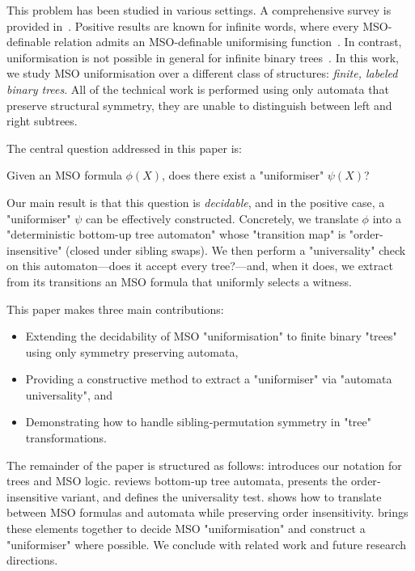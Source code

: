 \documentclass[a4paper,UKenglish,cleveref, autoref, thm-restate]{lipics-v2021}
\begin{document}
This problem has been studied in various settings. A comprehensive survey is provided in~\cite{Cara15}. Positive results are known for infinite words, where every MSO-definable
relation admits an MSO-definable uniformising function~\cite{Siefkes1975, Choffrut1999, Rabin07}. In contrast, uniformisation is not possible in general for infinite binary
trees~\cite{GS83}.
In this work, we study MSO uniformisation over a different class of structures: \emph{finite, labeled binary trees}.
All of the technical work is performed using only automata that preserve structural symmetry,
\ie they are unable to distinguish between left and right subtrees.

The central question addressed in this paper is:

\begin{problem}\label{prob:uniformisation-problem}
\AP Given an MSO formula $\phi(X)$, does there exist a "uniformiser" $\psi(X)$?
\end{problem}

Our main result is that this question is \emph{decidable}, and in the positive case, a "uniformiser" $\psi$ can be effectively constructed. Concretely, we translate $\phi$ into a
"deterministic bottom-up tree automaton" whose "transition map" is "order-insensitive" (\ie closed under sibling swaps). We then perform a "universality" check on this
automaton—does it accept every tree?—and, when it does, we extract from its transitions an MSO formula that uniformly selects a witness.

This paper makes three main contributions:
\begin{itemize}
	\item Extending the decidability of MSO "uniformisation" to finite binary "trees" using only symmetry preserving automata,
	\item Providing a constructive method to extract a "uniformiser" via "automata universality", and
	\item Demonstrating how to handle sibling‐permutation symmetry in "tree" transformations.
\end{itemize}

The remainder of the paper is structured as follows:
 introduces our notation for trees and MSO logic.
 reviews bottom‐up tree automata, presents the order‐insensitive variant, and defines the universality test.
 shows how to translate between MSO formulas and automata while preserving order insensitivity.
 brings these elements together to decide MSO "uniformisation" and construct a "uniformiser" where possible.
We conclude with related work and future research directions.
\end{document}
